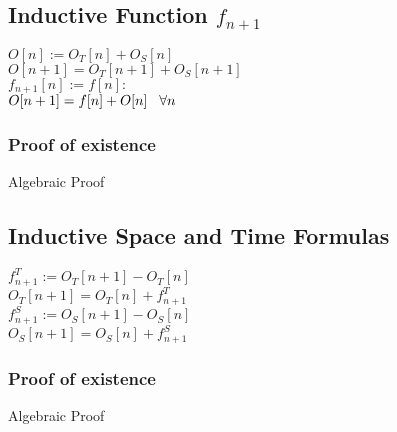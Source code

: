 \documentclass[11pt]{article}
\begin{document}
\subsection{Inductive Function $f_{n+1}$}
\begin{center}
\vspace{2mm}
$
O[n] := O_T[n] + O_S[n]
$
\\ \vspace{2mm}
$
O[n+1] = O_T[n+1] + O_S[n+1]
$
\\ \vspace{4mm}
$
f_{n+1}[n] := f[n] :
$
\\ \vspace{2mm}
$
O[n+1] = f[n] + O[n] \hspace{3mm} \forall n
$
\end{center}

\subsubsection{Proof of existence}
Algebraic Proof












\subsection{Inductive Space and Time Formulas}
\begin{center}
$
f^T_{n+1} := O_T[n+1] - O_T[n]
$
\\ \vspace{2mm}
$
O_T[n+1] = O_T[n] + f^T_{n+1}
$
\\ \vspace{2mm}
$
f^S_{n+1} := O_S[n+1] - O_S[n]
$
\\ \vspace{2mm}
$
O_S[n+1] = O_S[n] + f^S_{n+1}
$

\end{center}

\subsubsection{Proof of existence}
Algebraic Proof




\end{document}
